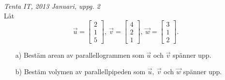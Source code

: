 {\it Tenta IT, 2013 Januari, uppg. 2}\\
Låt 
$$\vec{u}=\begin{bmatrix}2\\1\\5\end{bmatrix},\ \vec{v}=\begin{bmatrix}4\\2\\1\end{bmatrix},\ \vec{w}=\begin{bmatrix}3\\1\\2\end{bmatrix}.$$
\begin{itemize}
	\item[a) ] Bestäm arean av parallellogrammen som $\vec{u}$ och $\vec{v}$ spänner upp.
	\item[b) ] Bestäm volymen av parallellpipeden som $\vec{u},\ \vec{v}$ och $\vec{w}$ spänner upp.
\end{itemize}